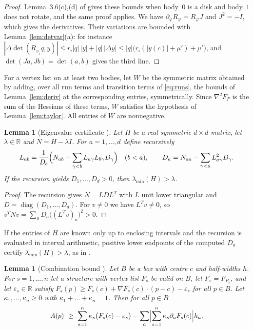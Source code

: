 \documentclass[11pt]{amsart}
\newtheorem{lemma}[theorem]{Lemma}
\theoremstyle{definition}
\theoremstyle{remark}
\numberwithin{equation}{section}
\newcommand{\R}{\mathbb{R}}
\newcommand{\lmin}{\lambda_{\min}}
\begin{document}
\begin{proof}
Lemma~3.6(c),(d) of \cite{Tom26} gives these bounds when body~$0$ is a disk and body~$1$ does not rotate, and the same proof applies. We have $\partial_\varphi R_\varphi=R_\varphi J$ and $J^2=-I$, which gives the derivatives. Their variations are bounded with Lemma~\ref{lem:detvar}(a): for instance $|\Delta\det(R_{\varphi_i}q,y)|\le r_i|q|\,|y|+|q|\,|\Delta y|\le|q|\bigl(r_i(|y(c)|+\mu')+\mu'\bigr)$, and $\det(Ja,Jb)=\det(a,b)$ gives the third line.
\end{proof}

For a vertex list on at least two bodies, let $W$ be the symmetric matrix obtained by adding, over all run terms and transition terms of \eqref{eq:runs}, the bounds of Lemma~\ref{lem:deriv} at the corresponding entries, symmetrically. Since $\nabla^2F_P$ is the sum of the Hessians of these terms, $W$ satisfies the hypothesis of Lemma~\ref{lem:taylor}. All entries of $W$ are nonnegative.

\begin{lemma}[Eigenvalue certificate {\cite[Lemma~3.7]{Tom26}}]\label{lem:ldl}
Let $H$ be a real symmetric $d\times d$ matrix, let $\lambda\in\R$ and $N=H-\lambda I$. For $a=1,\dots,d$ define recursively
\[
L_{ab}=\frac1{D_b}\Bigl(N_{ab}-\sum_{\gamma<b}L_{a\gamma}L_{b\gamma}D_\gamma\Bigr)\quad(b<a),\qquad D_a=N_{aa}-\sum_{\gamma<a}L_{a\gamma}^2D_\gamma.
\]
If the recursion yields $D_1,\dots,D_d>0$, then $\lmin(H)>\lambda$.
\end{lemma}

\begin{proof}
The recursion gives $N=LDL^T$ with $L$ unit lower triangular and $D=\operatorname{diag}(D_1,\dots,D_d)$. For $v\ne0$ we have $L^Tv\ne0$, so $v^TNv=\sum_aD_a\bigl((L^Tv)_a\bigr)^2>0$.
\end{proof}

If the entries of $H$ are known only up to enclosing intervals and the recursion is evaluated in interval arithmetic, positive lower endpoints of the computed $D_a$ certify $\lmin(H)>\lambda$, as in \cite{Tom26}.

\begin{lemma}[Combination bound {\cite[Lemma~3.8]{Tom26}}]\label{lem:comb}
Let $B$ be a box with centre $c$ and half-widths $h$. For $s=1,\dots,n$ let a structure with vertex list $P_s$ be valid on $B$, let $F_s=F_{P_s}$, and let $\varepsilon_s\in\R$ satisfy $F_s(p)\ge F_s(c)+\nabla F_s(c)\cdot(p-c)-\varepsilon_s$ for all $p\in B$. Let $\kappa_1,\dots,\kappa_n\ge0$ with $\kappa_1+\dots+\kappa_n=1$. Then for all $p\in B$
\[
A(p)\ \ge\ \sum_{s=1}^n\kappa_s\bigl(F_s(c)-\varepsilon_s\bigr)-\sum_a\Bigl|\sum_{s=1}^n\kappa_s\partial_aF_s(c)\Bigr|h_a.
\]
\end{lemma}
\end{document}
